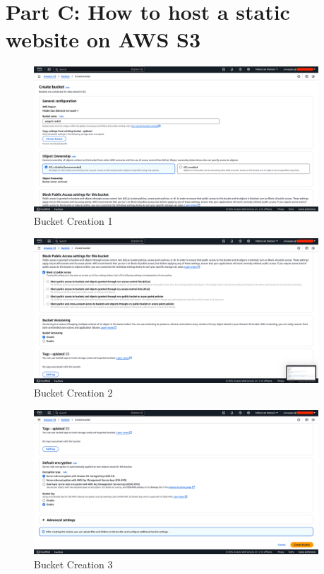 \documentclass[a4paper,12pt]{article}
\begin{document}
\section{Part C: How to host a static website on AWS S3}

\begin{figure}[H]
    \centering
    \includegraphics[width=0.95\textwidth]{host-static-website-1.png}
    \caption{Bucket Creation 1}
    \label{fig:static1}
\end{figure}

\begin{figure}[H]
    \centering
    \includegraphics[width=0.95\textwidth]{host-static-website-2.png}
    \caption{Bucket Creation 2}
    \label{fig:static2}
\end{figure}

\begin{figure}[H]
    \centering
    \includegraphics[width=0.95\textwidth]{host-static-website-3.png}
    \caption{Bucket Creation 3}
    \label{fig:static3}
\end{figure}
\end{document}
